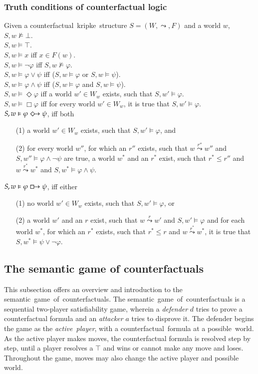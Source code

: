 \documentclass[a4paper,american]{paper}
\theoremstyle{definition}\newtheorem{definition}{Definition}
\begin{document}
\subsubsection{Truth conditions of counterfactual logic}
Given a counterfactual~kripke~structure $S = (W, \leadsto ,F)$ and a world $w$,\\
$S,w\nvDash\bot$.\\
$S,w\vDash\top$.\\
$S,w\vDash x$ iff $x\in F(w)$.\\
$S,w\vDash \neg\varphi$ iff $S,w\nvDash\varphi$.\\
$S,w\vDash \varphi\vee\psi$ iff ($S,w\vDash\varphi$ or $S,w\vDash\psi$).\\
$S,w\vDash \varphi\wedge\psi$ iff ($S,w\vDash\varphi$ and $S,w\vDash\psi$).\\
$S,w\vDash \Diamond \varphi$ iff a world $w'\in W_w$ exists, such that $S,w' \vDash \varphi$.\\
$S,w\vDash \Box \varphi$ iff for every world $w'\in W_w$, it is true that $S,w' \vDash \varphi$.\\
$S,w\vDash \varphi \Diamondright \psi$, iff both 
\begin{itemize}
	\item[(1)] a world $w'\in W_w$ exists, such that $S,w' \vDash \varphi$, and
	\item[(2)] for every world $w''$, for which an $r''$ exists, such that $w\overset{r''}{\leadsto}w''$ and $S,w'' \vDash \varphi\wedge\neg\psi$ are true, a world $w^*$ and an $r^*$ exist, such that $r^* \leq r''$ and $w\overset{r^*}{\leadsto}w^*$ and $S,w^* \vDash \varphi\wedge\psi$.
\end{itemize}

\noindent$S,w \vDash \varphi \boxright \psi$, iff either
\begin{itemize}
	\item[(1)] no world $w'\in W_w$ exists, such that $S,w' \vDash \varphi$, or
	\item[(2)] a world $w'$ and an $r$ exist, such that $w\overset{r}{\leadsto} w'$ and $S,w'\vDash \varphi$ and for each world $w^*$, for which an $r^*$ exists, such that $r^*\leq r$ and $w\overset{r^*}{\leadsto} w^*$, it is true that $S,w^*\vDash\psi\vee\neg\varphi$.
\end{itemize}
\subsection{The semantic game of counterfactuals}
This subsection offers an overview and introduction to the semantic~game~of~counterfactuals. The semantic~game~of~counterfactuals is a sequential two-player satisfiability game, wherein a \textit{defender} $d$ tries to prove a counterfactual formula and an \textit{attacker} $a$ tries to disprove it. The defender begins the game as the \textit{active~player}, with a counterfactual~formula at a possible~world. As the active player makes moves, the counterfactual formula is resolved step by step, until a player resolves a $\top$ and wins or cannot make any move and loses. Throughout the game, moves may also change the active player and possible world.
\end{document}
